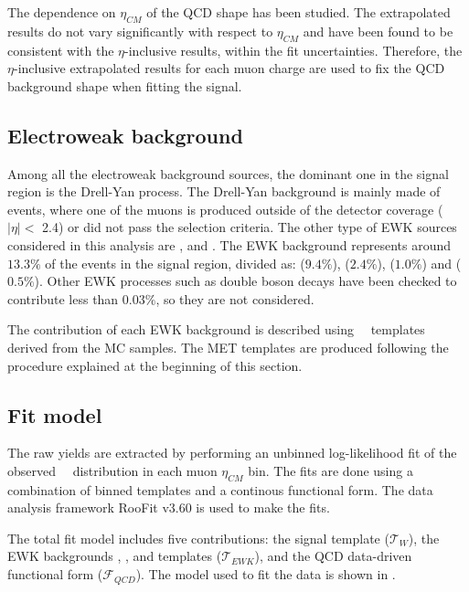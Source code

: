 The dependence on $\eta_{CM}$ of the QCD shape has been studied. The extrapolated results do not vary significantly with respect to $\eta_{CM}$ and have been found to be consistent with the $\eta$-inclusive results, within the fit uncertainties. Therefore, the $\eta$-inclusive extrapolated results for each muon charge are used to fix the QCD background shape when fitting the signal.


\subsection{Electroweak background}\label{sec:WBoson_SignalExtraction_EWKBackground}

Among all the electroweak background sources, the dominant one in the \W signal region is the Drell-Yan process. The Drell-Yan background is mainly made of \ZToMuMu events, where one of the muons is produced outside of the detector coverage ($|\eta|<$ 2.4) or did not pass the selection criteria. The other type of EWK sources considered in this analysis are \DYToTauTau, \WToTauNu and \ttbar. The EWK background represents around $13.3\%$ of the events in the signal region, divided as: \DYToMuMu ($9.4\%$), \WToTauNu ($2.4\%$), \DYToTauTau ($1.0\%$) and \ttbar ($0.5\%$). Other EWK processes such as double boson decays have been checked to contribute less than $0.03\%$, so they are not considered.

The contribution of each EWK background is described using \ETslash\ \ templates derived from the MC samples. The MET templates are produced following the procedure explained at the beginning of this section.


\subsection{Fit model}\label{sec:WBoson_SignalExtraction_FitModel}

The raw \WToMuNu yields are extracted by performing an unbinned log-likelihood fit of the observed \ETslash\ \ distribution in each muon $\eta_{CM}$ bin. The fits are done using a combination of binned templates and a continous functional form. The data analysis framework RooFit v3.60 \cite{RooFit} is used to make the fits.

The total fit model includes five contributions: the signal \WToMuNu template ($\mathcal{T}_{W}$), the EWK backgrounds \DYToMuMu, \WToTauNu, \DYToTauTau and \ttbar templates ($\mathcal{T}_{EWK}$), and the QCD data-driven functional form ($\mathcal{F}_{QCD}$). The model used to fit the data is shown in .

